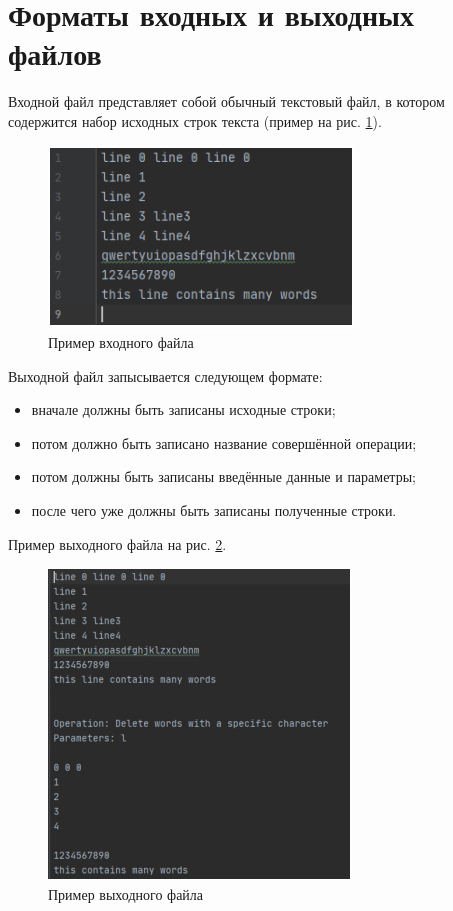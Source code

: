 \section*{Форматы входных и выходных файлов}

Входной файл представляет собой обычный текстовый файл, в котором содержится набор исходных строк текста (пример на рис. \ref{ife}).

\begin{figure}[H]
	\centering
	\includegraphics[width=0.6\linewidth]{photo/file_example}
	\caption{Пример входного файла}
	\label{ife}
\end{figure}

Выходной файл запысывается следующем формате:
\begin{itemize}
	\item вначале должны быть записаны исходные строки;
	\item потом должно быть записано название совершённой операции;
	\item потом должны быть записаны введённые данные и параметры;
	\item после чего уже должны быть записаны полученные строки.
\end{itemize}

Пример выходного файла на рис. \ref{ofe}.

\begin{figure}[H]
	\centering
	\includegraphics[width=0.6\linewidth]{photo/test.1.file}
	\caption{Пример выходного файла}
	\label{ofe}
\end{figure}